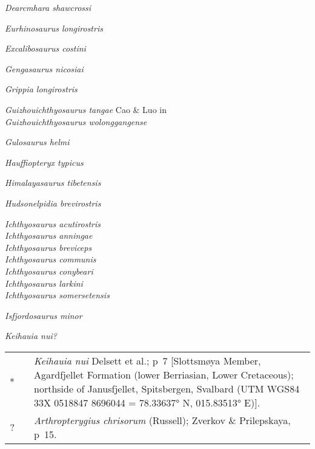 \documentclass[british,11pt]{article}
\newenvironment*{synonymy}%
	{
		\footnotesize
		\begin{tabu}[l]{rlX}
	}%
	{
		\\
		\end{tabu}
		\normalsize
	}
\begin{document}
\emph{Dearcmhara shawcrossi} \cite*[Brusatte et al.,][]{Brusatte2015}

\emph{Eurhinosaurus longirostris} \parencite*[Mantell,][]{Mantell1851}

\emph{Excalibosaurus costini} \cite*[McGowan,][]{McGowan1986}

\emph{Gengasaurus nicosiai} \cite*[Paparella et al.,][]{Paparella2016}

\emph{Grippia longirostris} \cite*[Wiman,][]{Wiman1929}

\emph{Guizhouichthyosaurus tangae} Cao \& Luo in \cite*[Yin et al.,][]{Yin2000}\\
\emph{Guizhouichthyosaurus wolonggangense} \parencite*[Chen et al.,][]{Chen2007}

\emph{Gulosaurus helmi} \cite*[Cuthbertson et al.,][]{Cuthbertson2013a}

\emph{Hauffiopteryx typicus} \cite*[Maisch,][]{Maisch2008b}

\emph{Himalayasaurus tibetensis} \cite*[Young \& Dong,][]{Young1972}

\emph{Hudsonelpidia brevirostris} \cite*[McGowan,][]{McGowan1995}

\emph{Ichthyosaurus acutirostris} \cite*[Owen,][]{Owen1840b}\\
\emph{Ichthyosaurus anningae} \cite*[Lomax \& Massare,][]{Lomax2015}\\
\emph{Ichthyosaurus breviceps} \cite*[Owen,][]{Owen1881}\\
\emph{Ichthyosaurus communis} \cite*[Conybeare,][]{Conybeare1822}\\
\emph{Ichthyosaurus conybeari} \cite*[Lydekker,][]{Lydekker1888}\\
\emph{Ichthyosaurus larkini} \cite*[Lomax \& Massare,][]{Lomax2017}\\
\emph{Ichthyosaurus somersetensis} \cite*[Lomax \& Massare,][]{Lomax2017}

\emph{Isfjordosaurus minor} \parencite*[Wiman,][]{Wiman1910}

\emph{Keihauia nui?} \cite*[Delsett et al.,][]{Delsett2017} \\
\begin{synonymy}
	*	& \cite*{Delsett2017}	& \emph{Keihauia nui} Delsett et al.; p~7 [Slottsmøya Member, Agardfjellet Formation (lower Berriasian, Lower Cretaceous); northside of Janusfjellet, Spitsbergen, Svalbard (UTM WGS84 33X 0518847 8696044 = 78.33637° N, 015.83513° E)]. \\
	?	&	\cite*{Zverkov2019}	&	\emph{Arthropterygius chrisorum} (Russell); Zverkov \& Prilepskaya, p~15.
\end{synonymy}
\end{document}
